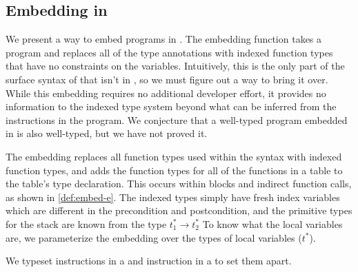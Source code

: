 \subsection{Embedding \wasm in \name}
\label{subsec:embedding}
We present a way to embed \wasm programs in \name.
The embedding function takes a \wasm program and replaces all of the type annotations with indexed function types that have no constraints on the variables.
Intuitively, this is the only part of the surface syntax of \wasm that isn't in \name, so we must figure out a way to bring it over.
While this embedding requires no additional developer effort, it provides no information to the indexed type system beyond what can be inferred from the instructions in the program.
We conjecture that a well-typed \wasm program embedded in \name is also well-typed, but we have not proved it.

The embedding replaces all function types used within the \wasm syntax with \name indexed function types, and adds the function types for all of the functions in a table to the table's type declaration.
This occurs within blocks and indirect function calls, as shown in \autoref{def:embed-e}.
The indexed types simply have fresh index variables which are different in the precondition and postcondition, and the primitive types for the stack are known from the \wasm type $t_1^{*} \rightarrow t_2^{*}$
To know what the local variables are, we parameterize the embedding over the types of local variables ($t^{*}$).

We typeset \name instructions in a  and \wasm instruction in a  to set them apart.

